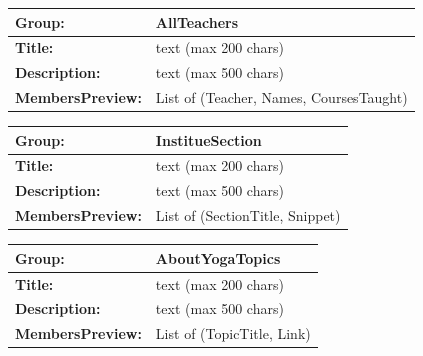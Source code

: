 \documentclass{article}
\begin{document}
\begin{center}
        \begin{tabularx}{\textwidth}{|>{\bfseries}l|X|}
                \hline
                Group: & \textbf{AllTeachers} \\
                \hline
                Title: & text  (max 200 chars)\\
                \hline
                Description: & text (max 500 chars) \\
                \hline
                MembersPreview: & List of {(Teacher, Names, CoursesTaught)} \\
                \hline

        \end{tabularx}
        \caption{Table: All Teachers }
\end{center}

\begin{center}
        \begin{tabularx}{\textwidth}{|>{\bfseries}l|X|}
                \hline
                Group: & \textbf{InstitueSection} \\
                \hline
                Title: & text  (max 200 chars)\\
                \hline
                Description: & text (max 500 chars) \\
                \hline
                MembersPreview: & List of {(SectionTitle, Snippet)} \\
                \hline

        \end{tabularx}
\end{center}


\begin{center}
        \begin{tabularx}{\textwidth}{|>{\bfseries}l|X|}
                \hline
                Group: & \textbf{AboutYogaTopics} \\
                \hline
                Title: & text  (max 200 chars)\\
                \hline
                Description: & text (max 500 chars) \\
                \hline
                MembersPreview: & List of {(TopicTitle, Link)} \\
                \hline

        \end{tabularx}
        \caption{Table: About Yoga Topics }
\end{center}
\end{document}
